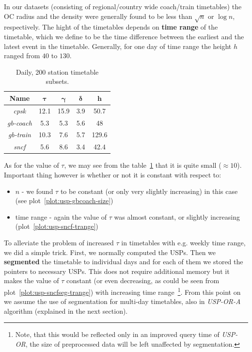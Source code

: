 \documentclass{svk_long_en}
\begin{document}
		In our datasets (consisting of regional/country wide coach/train timetables) the OC radius and the density were generally found to be less than $\sqrt{n}$ or $\log n$, respectively. The hight of the timetables depends on \textbf{time range} of the timetable, which we define to be the time difference between the earliest and the latest event in the timetable. Generally, for one day of time range the height $h$ ranged from $40$ to $130$. \\
		
		\begin{table}[H]
			\centering
            \begin{tabular}{c|c|c|c|c}
            	\hline
                \rowcolor{tablehead}
                \textbf{Name} & \textbf{$\bm{\tau}$} & \textbf{$\bm{\gamma}$} & \textbf{$\bm{\delta}$} & \textbf{$\bm{h}$} \\
				\hline
				\textit{cpsk} & 12.1 & 15.9 & 3.9 & 50.7 \\
				\textit{gb-coach} & 5.3 & 5.3 & 5.6 & 48 \\
				\textit{gb-train} & 10.3 & 7.6 & 5.7 & 129.6 \\
				\textit{sncf} & 5.6 & 8.6 & 3.4 & 42.4 \\
			\end{tabular}
			\caption{\label{table:prop} Daily, 200 station timetable subsets.}
		\end{table}
				
		As for the value of $\tau$, we may see from the table~\ref{table:prop} that it is quite small ($\approx 10$). Important thing however is whether or not it is constant with respect to:
		\begin{itemize}
			\item $n$ - we found $\tau$ to be constant (or only very slightly increasing) in this case (see plot~\ref{plot:usp-gbcoach-size})
			\item time range - again the value of $\tau$ was almost constant, or slightly increasing (plot~\ref{plot:usp-sncf-trange})
		\end{itemize}
		\hspace{\fill}
		
		To alleviate the problem of increased $\tau$ in timetables with e.g. weekly time range, we did a simple trick. First, we normally computed the USPs. Then we \textbf{segmented} the timetable to individual days and for each of them we stored the pointers to necessary USPs. This does not require additional memory but it makes the value of $\tau$ constant (or even decreasing, as could be seen from plot~\ref{plot:usp-sncfseg-trange}) with increasing time range~\footnote{Note, that this would be reflected only in an improved query time of \textit{USP-OR}, the size of preprocessed data will be left unaffected by segmentation.}. From this point on we assume the use of segmentation for multi-day timetables, also in \textit{USP-OR-A} algorithm (explained in the next section). \\	
		
\end{document}
